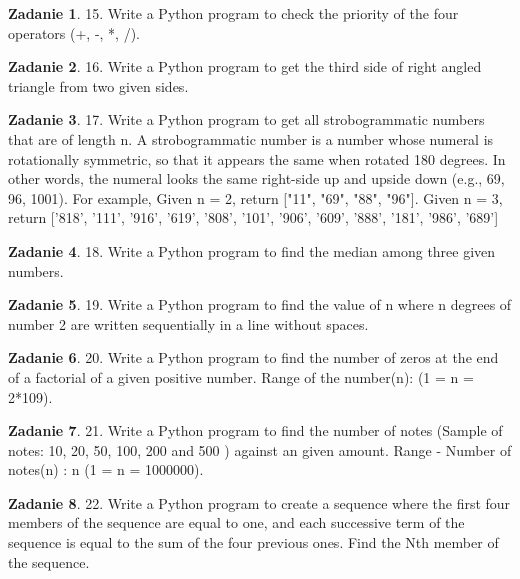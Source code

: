 \documentclass[11pt]{article}
\theoremstyle{definition}
\newtheorem{zadanie}{Zadanie}
\begin{document}
\begin{zadanie}
15. Write a Python program to check the priority of the four operators (+, -, *, /).
\end{zadanie}

\begin{zadanie}
16. Write a Python program to get the third side of right angled triangle from two given sides.
\end{zadanie}

\begin{zadanie}
17. Write a Python program to get all strobogrammatic numbers that are of length n.
A strobogrammatic number is a number whose numeral is rotationally symmetric, so that it appears the same when rotated 180 degrees. In other words, the numeral looks the same right-side up and upside down (e.g., 69, 96, 1001).
For example,
Given n = 2, return ["11", "69", "88", "96"].
Given n = 3, return ['818', '111', '916', '619', '808', '101', '906', '609', '888', '181', '986', '689']
\end{zadanie}

\begin{zadanie}
18. Write a Python program to find the median among three given numbers.
\end{zadanie}

\begin{zadanie}
19. Write a Python program to find the value of n where n degrees of number 2 are written sequentially in a line without spaces.
\end{zadanie}

\begin{zadanie}
20. Write a Python program to find the number of zeros at the end of a factorial of a given positive number.
Range of the number(n): (1 = n = 2*109).
\end{zadanie}

\begin{zadanie}
21. Write a Python program to find the number of notes (Sample of notes: 10, 20, 50, 100, 200 and 500 ) against an given amount.
Range - Number of notes(n) : n (1 = n = 1000000).
\end{zadanie}

\begin{zadanie}
22. Write a Python program to create a sequence where the first four members of the sequence are equal to one, and each successive term of the sequence is equal to the sum of the four previous ones. Find the Nth member of the sequence.
\end{zadanie}
\end{document}
